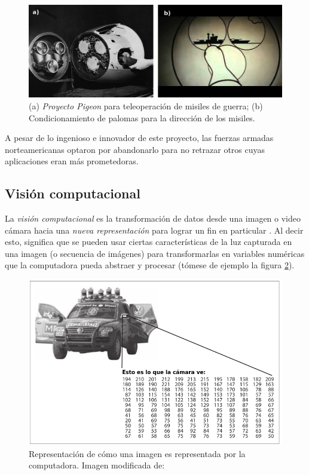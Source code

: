 \begin{figure}
\centering
\includegraphics[scale=0.3]{images/project_pigeon.png}
\caption{(a) \textit{Proyecto Pigeon} para teleoperación de misiles de guerra; (b) Condicionamiento de palomas para la dirección de los misiles.}
\label{fig:project_pigeon}
\end{figure}

	A pesar de lo ingenioso e innovador de este proyecto, las fuerzas armadas norteamericanas optaron por abandonarlo para no retrazar otros cuyas aplicaciones eran más prometedoras. 
		
		\subsection*{Visión computacional}
	La \textit{visión computacional} es la transformación de datos desde una imagen o video cámara hacia una \textit{nueva representación} para lograr un fin en particular \cite{bradski2008learning}. Al decir esto, significa que se pueden usar ciertas características de la luz capturada en una imagen (o secuencia de imágenes) para transformarlas en variables numéricas que la computadora pueda abstraer y procesar (tómese de ejemplo la figura \ref{fig:camera_representation}).

\begin{figure}
\centering
\includegraphics[scale=0.6]{images/new_representation_image.png}
\caption{Representación de cómo una imagen es representada por la computadora. Imagen modificada de:}
\label{fig:camera_representation}
\end{figure}

